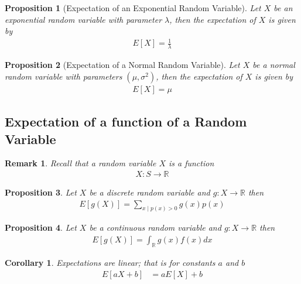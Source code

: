 \documentclass[11pt, oneside]{book}   	%
\newtheorem{remark}{Remark}[chapter]
\newtheorem{corollary}{Corollary}[chapter]
\newtheorem{proposition}{Proposition}[chapter]
\begin{document}
\begin{spacing}{1.618}
\begin{proposition}[Expectation of an Exponential Random Variable]
	Let $X$ be an exponential random variable with parameter $\lambda$, then the expectation of $X$ is given by 
	\begin{alignat}{4}
		E[X]=\frac{1}{\lambda}
	\end{alignat}
\end{proposition}

\begin{proposition}[Expectation of a Normal Random Variable]
	Let $X$ be a normal random variable with parameters $(\mu, \sigma^2)$, then the expectation of $X$ is given by 
	\begin{alignat}{4}
		E[X]=\mu
	\end{alignat}
\end{proposition}

\subsection{Expectation of a function of a Random Variable}

\begin{remark}
	Recall that a random variable $X$ is a function 
	\begin{alignat}{4}
		X:S\to \mathbb{R}
	\end{alignat}
\end{remark}

\begin{proposition}
	Let $X$ be a discrete random variable and $g:X\to \mathbb{R}$ then 
	\begin{alignat}{4}
		E[g(X)]=\sum_{x\mid p(x)>0}g(x)p(x)
	\end{alignat}
\end{proposition}

\begin{proposition}
	Let $X$ be a continuous random variable and $g:X\to\mathbb{R}$ then 
	\begin{alignat}{4}
		E[g(X)]=\int_{\mathbb{R}}g(x)f(x)dx
	\end{alignat}
\end{proposition}

\begin{corollary}
	Expectations are linear; that is for constants $a$ and $b$
	\begin{alignat}{4}
		E[aX+b]&=aE[X]+b
	\end{alignat}
\end{corollary}


\end{spacing}
\end{document}
